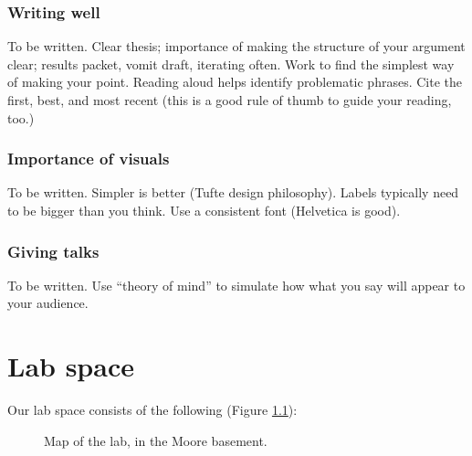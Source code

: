 \documentclass{tufte-book}
\begin{document}
\subsection{Writing well}

To be written. Clear thesis; importance of making the structure of
your argument clear; results packet, vomit draft, iterating
often. Work to find the simplest way of making your point. Reading
aloud helps identify problematic phrases. Cite the first, best, and
most recent (this is a good rule of thumb to guide your reading, too.)

\subsection{Importance of visuals}

To be written. Simpler is better (Tufte design philosophy). Labels
typically need to be bigger than you think. Use a consistent font
(Helvetica is good).

\subsection{Giving talks}

To be written. Use ``theory of mind'' to simulate how what you say
will appear to your audience.


\chapter{Lab space}

Our lab space consists of the following (Figure \ref{fig:labmap}):

\begin{figure}
\caption{Map of the lab, in the Moore basement.}
\label{fig:labmap}
\end{figure}
\end{document}
